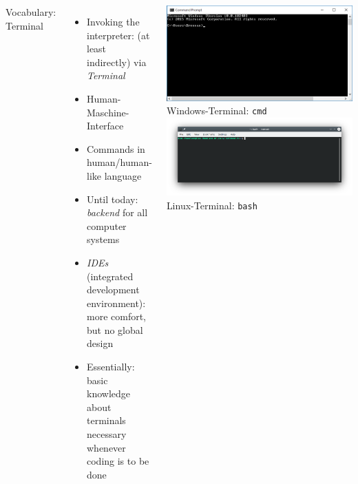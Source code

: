 \begin{frame}
%
\begin{columns}[T]
\begin{Large}
{Vocabulary: Terminal}
\end{Large}
\begin{itemize}
\item Invoking the interpreter: (at least indirectly) via \emph{Terminal}
\item Human-Maschine-Interface
\item Commands in human/human-like language
\item Until today: \emph{backend} for all computer systems
\item \emph{IDEs} (integrated development environment): more comfort, but no global design
\item Essentially: basic knowledge about terminals necessary whenever coding is to be done
\end{itemize}
%
\includegraphics[width=\linewidth]{./gfx/cmd}
{\tiny Windows-Terminal: \texttt{cmd}}
\includegraphics[width=\linewidth]{./gfx/bash}
{\tiny Linux-Terminal: \texttt{bash}}
\end{columns}
%
\end{frame}


